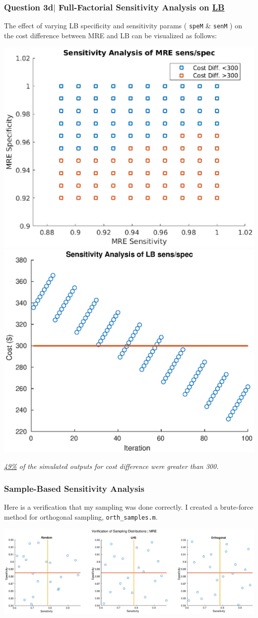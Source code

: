 \documentclass[aspectratio=1610]{beamer}
\begin{document}
\begin{frame}[fragile]
\frametitle{Question 3d$|$ Full-Factorial Sensitivity Analysis on \underline{LB}}

The effect of varying LB specificity and sensitivity params ( \verb|speM| \& \verb|senM| ) on the cost difference between MRE and LB can be visualized as follows:
\vspace{1.5em}

\centering
\includegraphics[width = .49\textwidth]{3d_1}
\includegraphics[width = .49\textwidth]{3d_2}

\textit{\underline{49\%} of the simulated outputs for cost difference were greater than 300.}

\end{frame}

\begin{frame}[fragile]
\frametitle{Sample-Based Sensitivity Analysis}
Here is a verification that my sampling was done correctly. I created a brute-force method for orthogonal sampling, \verb|orth_samples.m|. 

\vspace{1em}
\centering
\hspace*{-2cm}                                                           
\includegraphics[scale = .41]{sampling_ex}
\end{frame}
\end{document}
